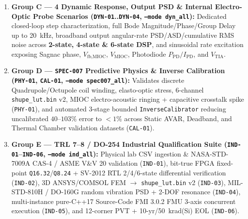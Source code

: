 \documentclass[11pt,a4paper]{article}
\begin{document}
\begin{enumerate}
    \item \textbf{Group C --- 4 Dynamic Response, Output PSD \& Internal Electro-Optic Probe Scenarios (\texttt{DYN-01}..\texttt{DYN-04}, \texttt{--mode dyn\_all}):} Dedicated closed-loop step characterization, full Bode Magnitude/Phase/Group Delay up to 20~kHz, broadband output angular-rate PSD/ASD/cumulative RMS noise across \textbf{2-state, 4-state \& 6-state DSP}, and sinusoidal rate excitation exposing Sagnac phase, $V_{\text{fb,MIOC}}$, $V_{\text{MIOC}}$, Photodiode $P_{\text{PD}}/I_{\text{PD}}$, and $V_{\text{TIA}}$.
    \item \textbf{Group D --- \texttt{SPEC-007} Predictive Physics \& Inverse Calibration (\texttt{PHY-01}, \texttt{CAL-01}, \texttt{--mode spec007\_all}):} Validates discrete Quadrupole/Octupole coil winding, elasto-optic stress, 6-channel \texttt{shupe\_lut.bin} v2, MIOC electro-acoustic ringing + capacitive crosstalk spike (\texttt{PHY-01}), and automated 3-stage bounded \texttt{InverseCalibrator} reducing uncalibrated $40$--$103\%$ error to $< 1\%$ across Static AVAR, Deadband, and Thermal Chamber validation datasets (\texttt{CAL-01}).
    \item \textbf{Group E --- TRL 7--8 / DO-254 Industrial Qualification Suite (\texttt{IND-01}--\texttt{IND-06}, \texttt{--mode ind\_all}):} Physical lab CSV ingestion \& NASA-STD-7009A CAS-4 / ASME V\&V 20 validation (\texttt{IND-01}), bit-true FPGA fixed-point \texttt{Q16.32}/\texttt{Q8.24} + SV-2012 RTL 2/4/6-state differential verification (\texttt{IND-02}), 3D ANSYS/COMSOL FEM $\to$ \texttt{shupe\_lut.bin} v2 (\texttt{IND-03}), MIL-STD-810H / DO-160G random vibration PSD + 2-DOF resonance (\texttt{IND-04}), multi-instance pure-C++17 Source-Code FMI 3.0.2 FMU 3-axis concurrent execution (\texttt{IND-05}), and 12-corner PVT + 10-yr/50~krad(Si) EOL (\texttt{IND-06}).
\end{enumerate}
\end{document}
